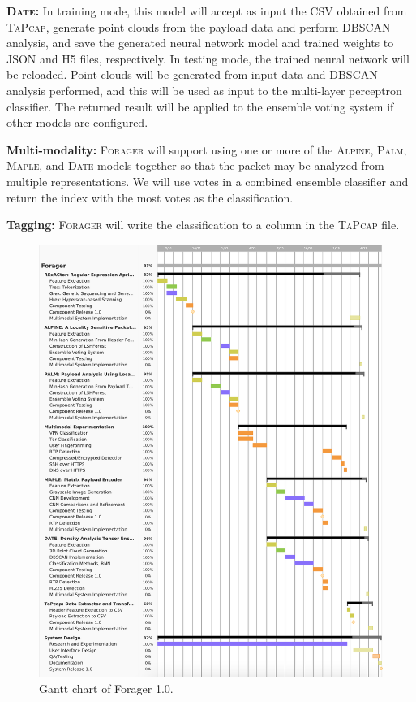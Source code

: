 \textbf{\textsc{Date}: } In training mode, this model will accept as input the CSV obtained from \textsc{TaPcap}, generate point clouds from the payload data and perform DBSCAN analysis, and save the generated neural network model and trained weights to JSON and H5 files, respectively. In testing mode, the trained neural network will be reloaded. Point clouds will be generated from input data and DBSCAN analysis performed, and this will be used as input to the multi-layer perceptron classifier. The returned result will be applied to the ensemble voting system if other models are configured.

\textbf{Multi-modality: } \textsc{Forager} will support using one or more of the \textsc{Alpine}, \textsc{Palm}, \textsc{Maple}, and \textsc{Date} models together so that the packet may be analyzed from multiple representations. We will use votes in a combined ensemble classifier and return the index with the most votes as the classification.

\textbf{Tagging: } \textsc{Forager} will write the classification to a column in the \textsc{TaPcap} file.

\begin{figure}
\includegraphics[width=\textwidth,height=\textheight]{chapters/expected/img/gantt.png}
\caption{Gantt chart of Forager 1.0.}
\label{fig:gantt}
\end{figure}
